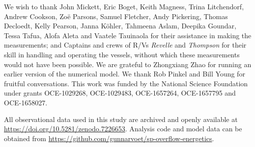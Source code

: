 \documentclass{ametsocV6.1}
\begin{document}
\clearpage

\acknowledgments
We wish to thank John Mickett, Eric Boget, Keith Magness, Trina Litchendorf, Andrew Cookson, Zo\"{e} Parsons, Samuel Fletcher, Andy Pickering, Thomas Decloedt, Kelly Pearson, Janna K\"ohler, Tahmeena Aslam, Deepika Goundar, Tessa Tafua, Alofa Aleta and Vaatele Tauinaola for their assistance in making the measurements; and Captains and crews of R/Vs \emph{Revelle} and \emph{Thompson} for their skill in handling and operating the vessels, without which these measurements would not have been possible.
We are grateful to Zhongxiang Zhao for running an earlier version of the numerical model.
We thank Rob Pinkel and Bill Young for fruitful conversations.
This work was funded by the National Science Foundation under grants OCE-1029268, OCE-1029483, OCE-1657264, OCE-1657795 and OCE-1658027.

\datastatement
All observational data used in this study are archived and openly available at \url{https://doi.org/10.5281/zenodo.7226653}. Analysis code and model data can be obtained from \url{https://github.com/gunnarvoet/sp-overflow-energetics}.


\appendix[A]
\end{document}
